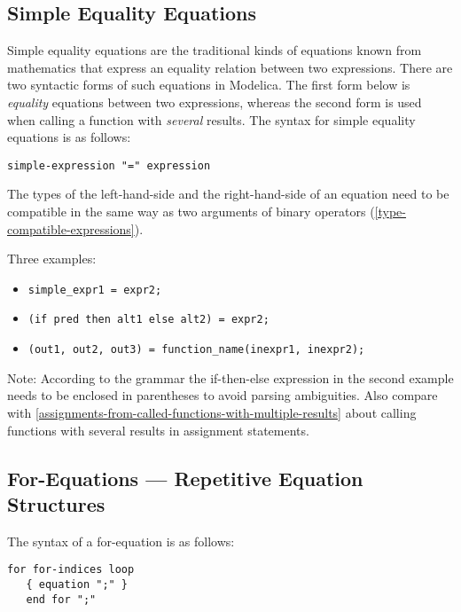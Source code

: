 \subsection{Simple Equality Equations}

Simple equality equations are the traditional kinds of equations known
from mathematics that express an equality relation between two
expressions. There are two syntactic forms of such equations in
Modelica. The first form below is \emph{equality} equations between two
expressions, whereas the second form is used when calling a function
with \emph{several} results. The syntax for simple equality equations is
as follows:
\begin{lstlisting}[language=grammar]
simple-expression "=" expression
\end{lstlisting}
The types of the left-hand-side and the right-hand-side of an equation
need to be compatible in the same way as two arguments of binary
operators (\autoref{type-compatible-expressions}).

Three examples:
\begin{itemize}
\item \lstinline!simple_expr1 = expr2;!
\item \lstinline!(if pred then alt1 else alt2) = expr2;!
\item \lstinline!(out1, out2, out3) = function_name(inexpr1, inexpr2);!
\end{itemize}

\begin{nonnormative}
Note: According to the grammar the if-then-else expression in
the second example needs to be enclosed in parentheses to avoid parsing
ambiguities. Also compare with \autoref{assignments-from-called-functions-with-multiple-results} about calling
functions with several results in assignment statements.
\end{nonnormative}

\subsection{For-Equations --- Repetitive Equation Structures}

The syntax of a for-equation is as follows:
\begin{lstlisting}[language=grammar]
for for-indices loop
   { equation ";" }
   end for ";"
\end{lstlisting}

